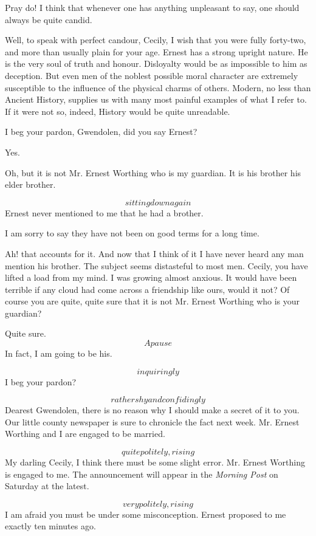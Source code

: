 \documentclass{book}
\begin{document}
\5  Pray do!  I think that whenever one has anything
unpleasant to say, one should always be quite candid.

\4  Well, to speak with perfect candour, Cecily, I wish
that you were fully forty-two, and more than usually plain for your
age.  Ernest has a strong upright nature.  He is the very soul of
truth and honour.  Disloyalty would be as impossible to him as
deception.  But even men of the noblest possible moral character
are extremely susceptible to the influence of the physical charms
of others.  Modern, no less than Ancient History, supplies us with
many most painful examples of what I refer to.  If it were not so,
indeed, History would be quite unreadable.

\5  I beg your pardon, Gwendolen, did you say Ernest?

\4  Yes.

\5  Oh, but it is not Mr. Ernest Worthing who is my guardian.
It is his brother \textemdash his elder brother.

\4  \[sitting down again\]  Ernest never mentioned to me
that he had a brother.

\5  I am sorry to say they have not been on good terms for a
long time.

\4  Ah! that accounts for it.  And now that I think of it I
have never heard any man mention his brother.  The subject seems
distasteful to most men.  Cecily, you have lifted a load from my
mind.  I was growing almost anxious.  It would have been terrible
if any cloud had come across a friendship like ours, would it not?
Of course you are quite, quite sure that it is not Mr. Ernest
Worthing who is your guardian?

\5  Quite sure.  \[A pause\]  In fact, I am going to be his.

\4  \[inquiringly\]  I beg your pardon?

\5  \[rather shy and confidingly\]  Dearest Gwendolen, there is
no reason why I should make a secret of it to you.  Our little
county newspaper is sure to chronicle the fact next week.  Mr.
Ernest Worthing and I are engaged to be married.

\4  \[quite politely, rising\]  My darling Cecily, I think
there must be some slight error.  Mr. Ernest Worthing is engaged to
me.  The announcement will appear in the \textit{Morning Post} on Saturday
at the latest.

\5  \[very politely, rising\]  I am afraid you must be under
some misconception.  Ernest proposed to me exactly ten minutes ago.
\end{document}
